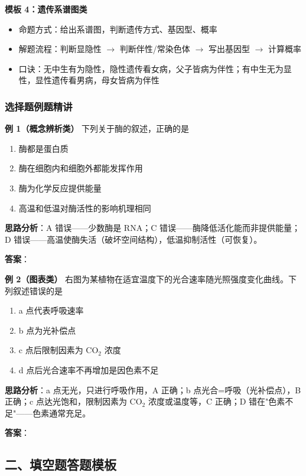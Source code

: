 \textbf{模板 4：遗传系谱图类}

\begin{itemize}
  \item 命题方式：给出系谱图，判断遗传方式、基因型、概率
  \item 解题流程：判断显隐性 $\to$ 判断伴性/常染色体 $\to$ 写出基因型 $\to$ 计算概率
  \item 口诀：无中生有为隐性，隐性遗传看女病，父子皆病为伴性；有中生无为显性，显性遗传看男病，母女皆病为伴性
\end{itemize}

\subsubsection{选择题例题精讲}

\textbf{例 1（概念辨析类）} 下列关于酶的叙述，正确的是
\begin{enumerate}
  \item[A.] 酶都是蛋白质
  \item[B.] 酶在细胞内和细胞外都能发挥作用
  \item[C.] 酶为化学反应提供能量
  \item[D.] 高温和低温对酶活性的影响机理相同
\end{enumerate}

\textbf{思路分析}：A 错误——少数酶是 RNA；C 错误——酶降低活化能而非提供能量；D 错误——高温使酶失活（破坏空间结构），低温抑制活性（可恢复）。

\textbf{答案}：

\textbf{例 2（图表类）} 右图为某植物在适宜温度下的光合速率随光照强度变化曲线。下列叙述错误的是
\begin{enumerate}
  \item[A.] a 点代表呼吸速率
  \item[B.] b 点为光补偿点
  \item[C.] c 点后限制因素为 CO$_2$ 浓度
  \item[D.] d 点后光合速率不再增加是因色素不足
\end{enumerate}

\textbf{思路分析}：a 点无光，只进行呼吸作用，A 正确；b 点光合=呼吸（光补偿点），B 正确；c 点达光饱和，限制因素为 CO$_2$ 浓度或温度等，C 正确；D 错在"色素不足"——色素通常充足。

\textbf{答案}：

\subsection{二、填空题答题模板}

